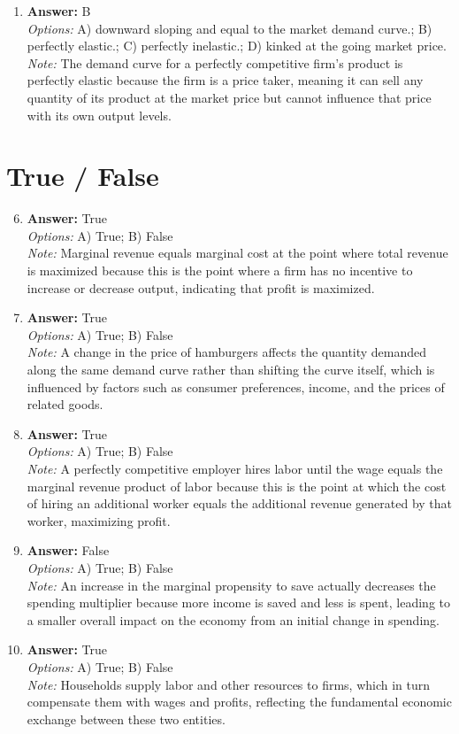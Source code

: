 \documentclass[12pt]{article}
\begin{document}
\begin{enumerate}[label=\arabic*.]
\item \textbf{Answer:} B
\\ \textit{Options:} A) downward sloping and equal to the market demand curve.; B) perfectly elastic.; C) perfectly inelastic.; D) kinked at the going market price.
\\ \textit{Note:} The demand curve for a perfectly competitive firm's product is perfectly elastic because the firm is a price taker, meaning it can sell any quantity of its product at the market price but cannot influence that price with its own output levels.
\end{enumerate}

\section*{True / False}
\begin{enumerate}[label=\arabic*.]
\setcounter{enumi}{5}
\item \textbf{Answer:} True
\\ \textit{Options:} A) True; B) False
\\ \textit{Note:} Marginal revenue equals marginal cost at the point where total revenue is maximized because this is the point where a firm has no incentive to increase or decrease output, indicating that profit is maximized.
\item \textbf{Answer:} True
\\ \textit{Options:} A) True; B) False
\\ \textit{Note:} A change in the price of hamburgers affects the quantity demanded along the same demand curve rather than shifting the curve itself, which is influenced by factors such as consumer preferences, income, and the prices of related goods.
\item \textbf{Answer:} True
\\ \textit{Options:} A) True; B) False
\\ \textit{Note:} A perfectly competitive employer hires labor until the wage equals the marginal revenue product of labor because this is the point at which the cost of hiring an additional worker equals the additional revenue generated by that worker, maximizing profit.
\item \textbf{Answer:} False
\\ \textit{Options:} A) True; B) False
\\ \textit{Note:} An increase in the marginal propensity to save actually decreases the spending multiplier because more income is saved and less is spent, leading to a smaller overall impact on the economy from an initial change in spending.
\item \textbf{Answer:} True
\\ \textit{Options:} A) True; B) False
\\ \textit{Note:} Households supply labor and other resources to firms, which in turn compensate them with wages and profits, reflecting the fundamental economic exchange between these two entities.
\end{enumerate}
\end{document}
